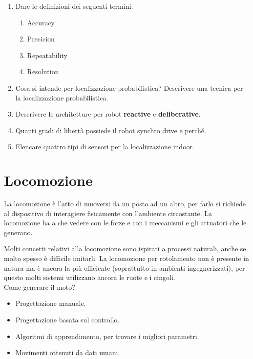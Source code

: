 \documentclass[a4paper,portrait,12pt]{article}
\theoremstyle{definition}
\begin{document}
\begin{enumerate}
\item Dare le definizioni dei seguenti termini:
\begin{enumerate}
\item Accuracy
\item Precicion
\item Repeatability
\item Resolution
\end{enumerate}

\item Cosa si intende per localizzazione probabilistica? Descrivere una tecnica per la localizzazione probabilistica.

\item Descrivere le architetture per robot \textbf{reactive} e \textbf{deliberative}.

\item Quanti gradi di libertà possiede il robot synchro drive e perché.

\item Elencare quattro tipi di sensori per la localizzazione indoor.

\end{enumerate}



\section{Locomozione}



La locomozione è l'atto di muoversi da un posto ad un altro, per farlo si richiede al dispositivo di interagiere fisicamente con l'ambiente circostante.
La locomozione ha a che vedere con le forze e con i meccanismi e gli attuatori che le generano.

Molti concetti relativi alla locomozione sono ispirati a processi naturali, anche se molto spesso è difficile imitarli.
La locomozione per rotolamento non è presente in natura ma è ancora la più efficiente (soprattutto in ambienti ingegnerizzati), per questo molti sistemi utilizzano ancora le ruote e i cingoli.\\

Come generare il moto?
\begin{itemize}
\item Progettazione manuale.
\item Progettazione basata sul controllo.
\item Algoritmi di apprendimento, per trovare i migliori parametri.
\item Movimenti ottenuti da dati umani.
\end{itemize}
\end{document}
